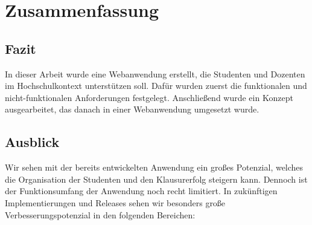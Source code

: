 \chapter{Zusammenfassung}

\section{Fazit} %
In dieser Arbeit wurde eine Webanwendung erstellt, die Studenten und Dozenten im Hochschulkontext unterstützen soll.
Dafür wurden zuerst die funktionalen und nicht-funktionalen Anforderungen festgelegt.
Anschließend wurde ein Konzept ausgearbeitet, das danach in einer Webanwendung umgesetzt wurde.

\section{Ausblick}
Wir sehen mit der bereits entwickelten Anwendung ein großes Potenzial, welches die Organisation der Studenten und den Klausurerfolg steigern kann. Dennoch ist der Funktionsumfang der Anwendung noch recht limitiert.
In zukünftigen Implementierungen und Releases sehen wir besonders große Verbesserungspotenzial in den folgenden Bereichen:

